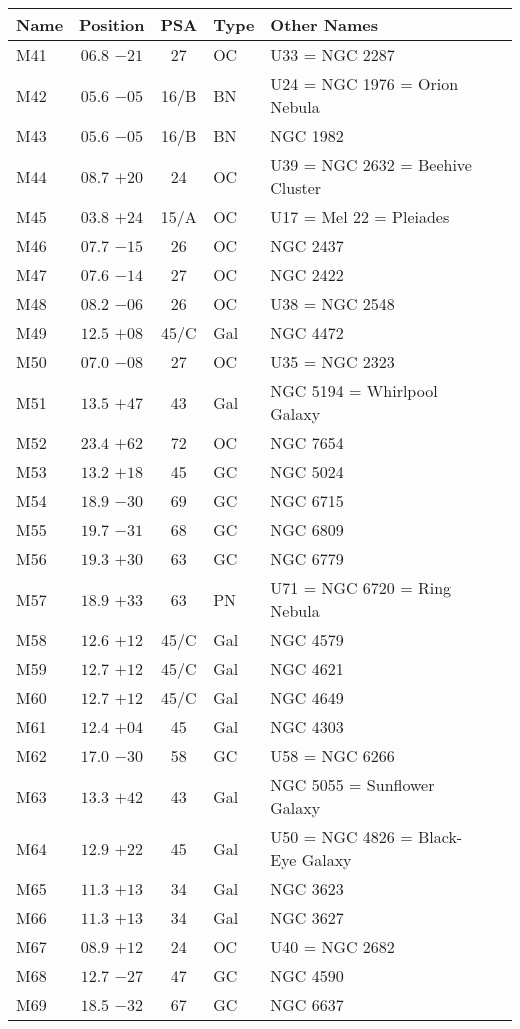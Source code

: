 \begin{table}[t]
\setlength{\tabcolsep}{2pt}
\small
\begin{tabular}{lcclll}
\hline
Name&Position&PSA&Type&Other Names\\
\hline
M41  &$06.8$ $-21$&27&OC &U33 = NGC 2287\\
M42  &$05.6$ $-05$&16/B&BN &U24 = NGC 1976 = Orion Nebula\\
M43  &$05.6$ $-05$&16/B&BN &NGC 1982\\
M44  &$08.7$ $+20$&24&OC &U39 = NGC 2632 = Beehive Cluster\\
M45  &$03.8$ $+24$&15/A&OC &U17 = Mel 22 = Pleiades\\
M46  &$07.7$ $-15$&26&OC &NGC 2437\\
M47  &$07.6$ $-14$&27&OC &NGC 2422\\
M48  &$08.2$ $-06$&26&OC &U38 = NGC 2548\\
M49  &$12.5$ $+08$&45/C&Gal&NGC 4472\\
M50  &$07.0$ $-08$&27&OC &U35 = NGC 2323\\
M51  &$13.5$ $+47$&43&Gal&NGC 5194 = Whirlpool Galaxy\\
M52  &$23.4$ $+62$&72&OC &NGC 7654\\
M53  &$13.2$ $+18$&45&GC &NGC 5024\\
M54  &$18.9$ $-30$&69&GC &NGC 6715\\
M55  &$19.7$ $-31$&68&GC &NGC 6809\\
M56  &$19.3$ $+30$&63&GC &NGC 6779\\
M57  &$18.9$ $+33$&63&PN &U71 = NGC 6720 = Ring Nebula\\
M58  &$12.6$ $+12$&45/C&Gal&NGC 4579\\
M59  &$12.7$ $+12$&45/C&Gal&NGC 4621\\
M60  &$12.7$ $+12$&45/C&Gal&NGC 4649\\
M61  &$12.4$ $+04$&45&Gal&NGC 4303\\
M62  &$17.0$ $-30$&58&GC &U58 = NGC 6266\\
M63  &$13.3$ $+42$&43&Gal&NGC 5055 = Sunflower Galaxy\\
M64  &$12.9$ $+22$&45&Gal&U50 = NGC 4826 = Black-Eye Galaxy\\
M65  &$11.3$ $+13$&34&Gal&NGC 3623\\
M66  &$11.3$ $+13$&34&Gal&NGC 3627\\
M67  &$08.9$ $+12$&24&OC &U40 = NGC 2682\\
M68  &$12.7$ $-27$&47&GC &NGC 4590\\
M69  &$18.5$ $-32$&67&GC &NGC 6637\\

\end{tabular}
\end{table}
